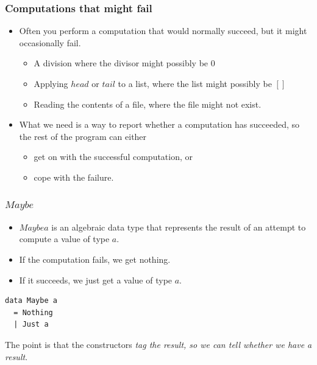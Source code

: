 \documentclass{beamer}
\begin{document}
\begin{frame}[fragile]
\frametitle{Computations that might fail}

\begin{itemize}
\item Often you perform a computation that would normally succeed,
  but it might occasionally fail.
  \begin{itemize}
  \item A division where the divisor might possibly be 0
  \item Applying $head$ or $tail$ to a list, where the list might
    possibly be $[]$
  \item Reading the contents of a file, where the file might not exist.
  \end{itemize}
\item What we need is a way to report whether a computation has
  succeeded, so the rest of the program can either
  \begin{itemize}
  \item get on with the successful computation, or
  \item cope with the failure.
  \end{itemize}
\end{itemize}

\end{frame}

\begin{frame}[fragile]
\frametitle{$Maybe$}

\begin{itemize}
\item $Maybe a$ is an algebraic data type that represents the
  result of an attempt to compute a value of type $a$.
\item If the computation fails, we get nothing.
\item If it succeeds, we just get a value of type $a$.
\end{itemize}

\begin{verbatim}
data Maybe a
  = Nothing
  | Just a
\end{verbatim}

The point is that the constructors \emph{tag the result, so we can
  tell whether we have a result}.

\end{frame}
\end{document}
